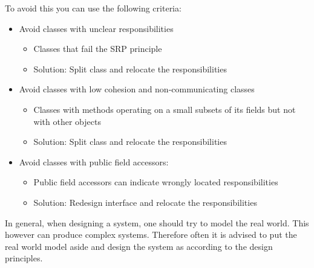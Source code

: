\documentclass[
../../Software_Engineering_Summary.tex,
]
{subfiles}
\begin{document}
To avoid this you can use the following criteria:
\begin{itemize}
    \item Avoid classes with unclear responsibilities
    \begin{itemize}
        \item Classes that fail the SRP principle
        \item Solution: Split class and relocate the responsibilities
    \end{itemize}
    \item Avoid classes with low cohesion and non-communicating classes
    \begin{itemize}
        \item Classes with methods operating on a small subsets of its fields but not with other objects
        \item Solution: Split class and relocate the responsibilities
    \end{itemize}
    \item Avoid classes with public field accessors:
    \begin{itemize}
        \item Public field accessors can indicate wrongly located responsibilities
        \item Solution: Redesign interface and relocate the responsibilities
    \end{itemize}
\end{itemize}

In general, when designing a system, one should try to model the real world. This however can produce complex systems. Therefore often it is advised to put the real world model aside and design the system as according to the design principles.
\end{document}
